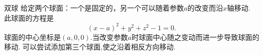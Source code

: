 ﻿\begin{surferPage}{双球}
给定两个球面：一个是固定的，另一个可以随着参数$a$的改变而沿$x$轴移动.
此球面的方程是
\[(x-a)^2+y^2+z^2-1=0.\]
球面的中心坐标是$(a,0,0)$.当改变参数$a$时球面中心随之变动而进一步导致球面的移动.
可以尝试添加第三个球面,使之沿着相反方向移动.
\end{surferPage}


